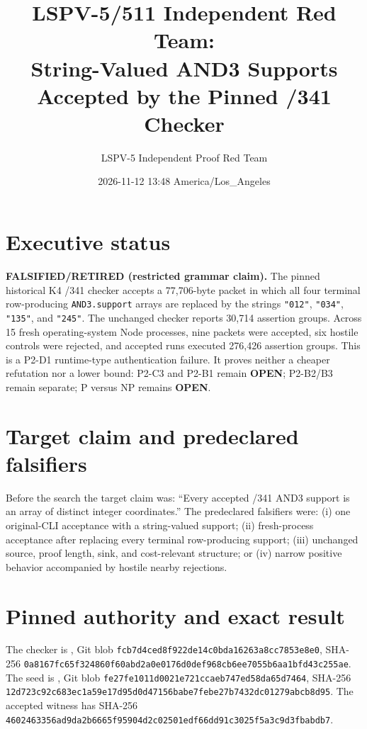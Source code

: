 \documentclass[11pt]{article}
\title{LSPV-5/511 Independent Red Team:\\String-Valued AND3 Supports Accepted by the Pinned /341 Checker}
\author{LSPV-5 Independent Proof Red Team}
\date{2026-11-12 13:48 America/Los\_Angeles}
\newcommand{\status}[1]{\textbf{#1}}
\begin{document}
\maketitle

\section*{Executive status}
\status{FALSIFIED/RETIRED (restricted grammar claim).}  The pinned historical K4 /341 checker accepts a 77,706-byte packet in which all four terminal row-producing \texttt{AND3.support} arrays are replaced by the strings \texttt{"012"}, \texttt{"034"}, \texttt{"135"}, and \texttt{"245"}.  The unchanged checker reports 30,714 assertion groups.  Across 15 fresh operating-system Node processes, nine packets were accepted, six hostile controls were rejected, and accepted runs executed 276,426 assertion groups.  This is a P2-D1 runtime-type authentication failure.  It proves neither a cheaper refutation nor a lower bound: P2-C3 and P2-B1 remain \status{OPEN}; P2-B2/B3 remain separate; P versus NP remains \status{OPEN}.

\section*{Target claim and predeclared falsifiers}
Before the search the target claim was: ``Every accepted /341 AND3 support is an array of distinct integer coordinates.''  The predeclared falsifiers were: (i) one original-CLI acceptance with a string-valued support; (ii) fresh-process acceptance after replacing every terminal row-producing support; (iii) unchanged source, proof length, sink, and cost-relevant structure; or (iv) narrow positive behavior accompanied by hostile nearby rejections.

\section*{Pinned authority and exact result}
The checker is , Git blob
\texttt{fcb7d4ced8f922de14c0bda16263a8cc7853e8e0}, SHA-256
\texttt{0a8167fc65f324860f60abd2a0e0176d0def968cb6ee7055b6aa1bfd43c255ae}.
The seed is , Git blob
\texttt{fe27fe1011d0021e721ccaeb747ed58da65d7464}, SHA-256
\texttt{12d723c92c683ec1a59e17d95d0d47156babe7febe27b7432dc01279abcb8d95}.
The accepted witness has SHA-256
\texttt{4602463356ad9da2b6665f95904d2c02501edf66dd91c3025f5a3c9d3fbabdb7}.
\end{document}
